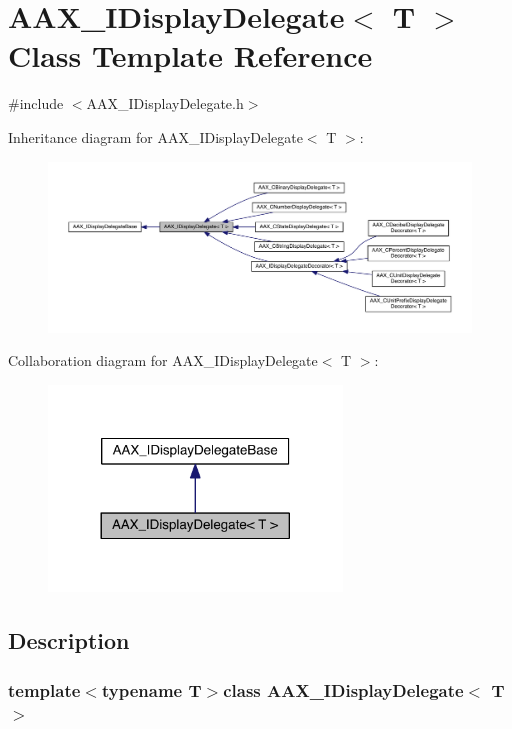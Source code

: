 \hypertarget{a00092}{}\section{A\+A\+X\+\_\+\+I\+Display\+Delegate$<$ T $>$ Class Template Reference}
\label{a00092}


{\ttfamily \#include $<$A\+A\+X\+\_\+\+I\+Display\+Delegate.\+h$>$}



Inheritance diagram for A\+A\+X\+\_\+\+I\+Display\+Delegate$<$ T $>$\+:
\nopagebreak
\begin{figure}[H]
\begin{center}
\leavevmode
\includegraphics[width=350pt]{a00613}
\end{center}
\end{figure}


Collaboration diagram for A\+A\+X\+\_\+\+I\+Display\+Delegate$<$ T $>$\+:
\nopagebreak
\begin{figure}[H]
\begin{center}
\leavevmode
\includegraphics[width=221pt]{a00614}
\end{center}
\end{figure}


\subsection{Description}
\subsubsection*{template$<$typename T$>$class A\+A\+X\+\_\+\+I\+Display\+Delegate$<$ T $>$}

